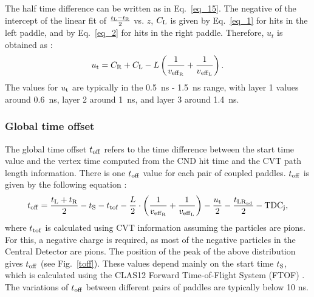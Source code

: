 The half time difference can be written as in Eq.~\ref{eq_15}. 
The negative of the intercept of the linear fit of $\frac{t_{\rm{L}}-t_{\rm{R}}}{2}$ vs. $z$, $C_{\rm{L}}$ is given by Eq.~\ref{eq_1} for hits in the left paddle, and by Eq.~\ref{eq_2} for hits in the right paddle. 
Therefore, $u_t$ is obtained as :
\begin{equation}
u_{\rm{t}}=C_{\rm{R}}+C_{\rm{L}}-L \left(\frac{1}{v_{\rm{eff}_{\rm{R}}}}+\frac{1}{v{_{\rm{eff}_{\rm{L}}}}}\right).
\end{equation}
The values for $u_{\rm{t}}$ are typically in the 0.5~ns - 1.5~ns range, with layer 1 values around 0.6~ns, layer 2 around 1~ns, and layer 3 around 1.4~ns.

\subsubsection{Global time offset}

The global time offset $t_{\rm{off}}$ refers to the time difference between the start time value and the vertex time computed from the CND hit time and the CVT path length information. There is one $t_{\rm off}$ value for each pair of coupled paddles.
$t_{\rm{off}}$ is given by the following equation :
\begin{equation}
t_{\rm{off}} = \frac{t_{\rm{L}}+t_{\rm{R}}}{2} - t_{\rm{S}} - t_{\rm{tof}}
                    - \frac{L}{2} \cdot \left(\frac{1}{v_{\rm{eff}_{\rm{R}}}} + \frac{1}{v_{\rm{eff}_L}}\right) - \frac{u_{\rm{t}}}{2} - \frac{t_{\rm{LR}_{\rm{ad}}}}{2}-{\rm{TDC}}_{\rm{j}},
\end{equation}
where $t_{\rm{tof}}$ is calculated using CVT information assuming the particles are pions. For this, a negative charge is required, as most of the negative particles in the Central Detector are pions. The position of the peak of the above distribution gives $t_{\rm{off}}$ (see Fig.~\ref{toff}). These values depend mainly on the start time $t_{\rm{S}}$, which is calculated using the CLAS12 Forward Time-of-Flight System (FTOF) \cite{ftof-nim}. The variations of $t_{\rm{off}}$ between different pairs of paddles are typically below 10 ns.

